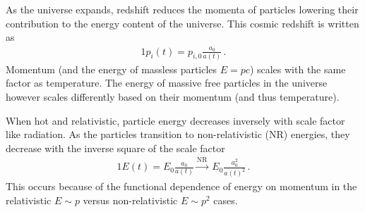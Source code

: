 As the universe expands, redshift reduces the momenta of particles lowering their contribution to the energy content of the universe. This cosmic redshift is written as
\begin{alignat}{1}
  \label{Redshift} p_{i}(t) = p_{i,0}\frac{a_{0}}{a(t)}\,.
\end{alignat}
Momentum (and the energy of massless particles $E=pc$) scales with the same factor as temperature. The energy of massive free particles in the universe however scales differently based on their momentum (and thus temperature).

When hot and relativistic, particle energy decreases inversely with scale factor like radiation. As the particles transition to non-relativistic (NR) energies, they decrease with the inverse square of the scale factor
\begin{alignat}{1}
    \label{EScale} E(t) = E_{0}\frac{a_{0}}{a(t)}\xrightarrow{\mathrm{NR}}\  E_{0}\frac{a_{0}^{2}}{a(t)^{2}}\,.
\end{alignat}
This occurs because of the functional dependence of energy on momentum in the relativistic $E\sim p$ versus non-relativistic $E\sim p^{2}$ cases.